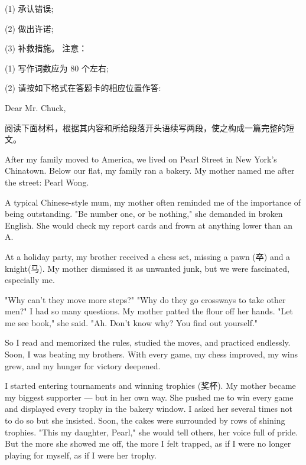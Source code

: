 \documentclass{英语试卷}
\begin{document}
\par (1) 承认错误;\par
\par (2) 做出许诺;\par
\par (3) 补救措施。 注意：\par
\par (1) 写作词数应为 80 个左右;\par
\par (2) 请按如下格式在答题卡的相应位置作答:\par
\par Dear Mr. Chuck,\par
{}
\par 阅读下面材料，根据其内容和所给段落开头语续写两段，使之构成一篇完整的短文。\par
\par After my family moved to America, we lived on Pearl Street in New York's Chinatown. Below our flat, my family ran a bakery. My mother named me after the street: Pearl Wong.\par
\par A typical Chinese-style mum, my mother often reminded me of the importance of being outstanding. "Be number one, or be nothing," she demanded in broken English. She would check my report cards and frown at anything lower than an A.\par
\par At a holiday party, my brother received a chess set, missing a pawn (卒) and a knight(马). My mother dismissed it as unwanted junk, but we were fascinated, especially me.\par
\par "Why can't they move more steps?" "Why do they go crossways to take other men?" I had so many questions. My mother patted the flour off her hands. "Let me see book," she said. "Ah. Don't know why? You find out yourself."\par
\par So I read and memorized the rules, studied the moves, and practiced endlessly. Soon, I was beating my brothers. With every game, my chess improved, my wins grew, and my hunger for victory deepened.\par
\par I started entering tournaments and winning trophies (奖杯). My mother became my biggest supporter — but in her own way. She pushed me to win every game and displayed every trophy in the bakery window. I asked her several times not to do so but she insisted. Soon, the cakes were surrounded by rows of shining trophies. "This my daughter, Pearl," she would tell others, her voice full of pride. But the more she showed me off, the more I felt trapped, as if I were no longer playing for myself, as if I were her trophy.\par
\end{document}
